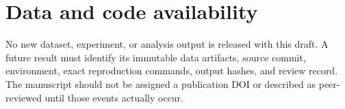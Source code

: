 \documentclass[aps,preprint,superscriptaddress,longbibliography]{revtex4-2}
\begin{document}
\section*{Data and code availability}

No new dataset, experiment, or analysis output is released with this draft.
A future result must identify its immutable data artifacts, source commit,
environment, exact reproduction commands, output hashes, and review record.
The manuscript should not be assigned a publication DOI or described as
peer-reviewed until those events actually occur.
\end{document}
